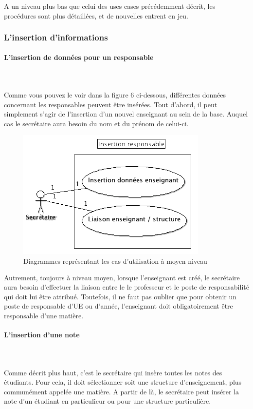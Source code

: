 \documentclass[letter, 11pt] {article}
\begin{document}
		A un niveau plus bas que celui des uses cases précédemment décrit, les procédures sont plus détaillées, et de nouvelles entrent en jeu.
		
		\subsubsection{L'insertion d'informations}
		
			\paragraph{L'insertion de données pour un responsable}
~\	\paragraph{ }	Comme vous pouvez le voir dans la figure 6 ci-dessous, différentes données concernant les responsables peuvent être insérées. Tout d'abord, il peut simplement s'agir de l'insertion d'un nouvel enseignant au sein de la base. Auquel cas le secrétaire aura besoin du nom et du prénom de celui-ci.
		
		\begin{figure}[!h]
			\centering
				\includegraphics[scale = 0.7]{../UseCase/UseCaseMoyenNiveau/InsertionResponsable.png}
			\caption{Diagrammes représentant les cas d'utilisation à moyen niveau}
		\end{figure}
		
		Autrement, toujours à niveau moyen, lorsque l'enseignant est créé, le secrétaire aura besoin d'effectuer la liaison entre le le professeur et le poste de responsabilité qui doit lui être attribué. Toutefois, il ne faut pas oublier que pour obtenir un poste de responsable d'UE ou d'année, l'enseignant doit obligatoirement être responsable d'une matière.
		
		\newpage
			\paragraph{L'insertion d'une note}~\		\paragraph{ }Comme décrit plus haut, c'est le secrétaire qui insère toutes les notes des étudiants. Pour cela, il doit sélectionner soit une structure d'enseignement, plus communément appelée une matière. A partir de là, le secrétaire peut insérer la note d'un étudiant en particulieur ou pour une structure particulière.
		
\end{document}
